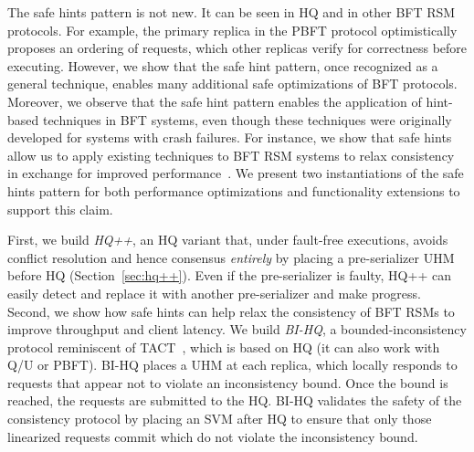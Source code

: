 \documentclass[twocolumn,10pt]{article}
\begin{document}
The safe hints pattern is not new. It can be seen in HQ and in other
BFT RSM protocols. For example, the primary replica in the PBFT
protocol optimistically proposes an ordering of requests, which other
replicas verify for correctness before executing. However, we show
that the safe hint pattern, once recognized as a general technique,
enables many additional safe optimizations of BFT protocols.
Moreover, we observe that the safe hint pattern enables the
application of hint-based techniques in BFT systems, even though these
techniques were originally developed for systems with crash failures.  For
instance, we show that safe hints allow us to apply existing
techniques to BFT RSM systems to relax consistency in exchange for
improved performance~\cite{Satyanarayanan2002,Terry1995,Yu2002}.  We
present two instantiations of the safe hints pattern for both
performance optimizations and functionality extensions to support this
claim.

First, we build \emph{HQ++}, an HQ variant that, under fault-free executions,
avoids conflict resolution and hence consensus
\emph{entirely} by placing a 
pre-serializer UHM before HQ (Section~\ref{sec:hq++}).  Even if the pre-serializer
is faulty, HQ++ can easily detect and replace it with another pre-serializer and
make progress. Second, we show how safe hints
can help relax the consistency of BFT RSMs to improve throughput and
client latency. We build \emph{BI-HQ}, a bounded-inconsistency
protocol reminiscent of TACT~\cite{Yu2002}, which is based on HQ (it
can also work with Q/U or PBFT). BI-HQ places a UHM at each replica,
which locally responds to requests that appear not to violate an
inconsistency bound. Once the bound is reached, the requests are
submitted to the HQ. BI-HQ validates the safety of the consistency protocol
by placing an SVM after HQ to ensure that only those linearized requests
commit which do not violate the inconsistency bound.

\end{document}
